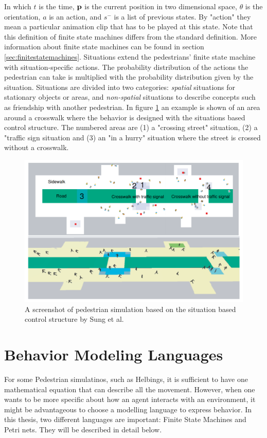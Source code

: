 \documentclass[11pt, a4paper]{book}
\begin{document}
In which $t$ is the time, $\bf{p}$ is the current position in two dimensional space, $\theta$ is the orientation, $a$ is an action, and $s^-$ is a list of previous states. By "action" they mean a particular animation clip that has to be played at this state. Note that this definition of finite state machines differs from the standard definition. More information about finite state machines can be found in section \ref{sec:finitestatemachines}.  Situations extend the pedestrians' finite state machine with situation-specific actions. The probability distribution of the actions the pedestrian can take is multiplied with the probability distribution given by the situation. Situations are divided into two categories: \emph{spatial} situations for stationary objects or areas, and \emph{non-spatial} situations to describe concepts such as friendship with another pedestrian. In figure \ref{fig:sungsituations} an example is shown of an area around a crosswalk where the behavior is designed with the situations based control structure. The numbered areas are (1) a "crossing street" situation, (2) a "traffic sign situation and (3) an "in a hurry" situation where the street is crossed without a crosswalk.

\begin{figure}[h!]
\centering
\includegraphics[width=.6\textwidth]{./sung_situations_example.png}
\caption{A screenshot of pedestrian simulation based on the situation based control structure by Sung et al.}
\label{fig:sungsituations}
\end{figure}



\section{Behavior Modeling Languages}
For some Pedestrian simulatinos, such as Helbings, it is sufficient to have one mathematical equation that can describe all the movement. However, when one wants to be more specific about how an agent interacts with an environment, it might be advantageous to choose a modelling language to express behavior. In this thesis, two different languages are important: Finite State Machines and Petri nets. They will be described in detail below.
\end{document}
